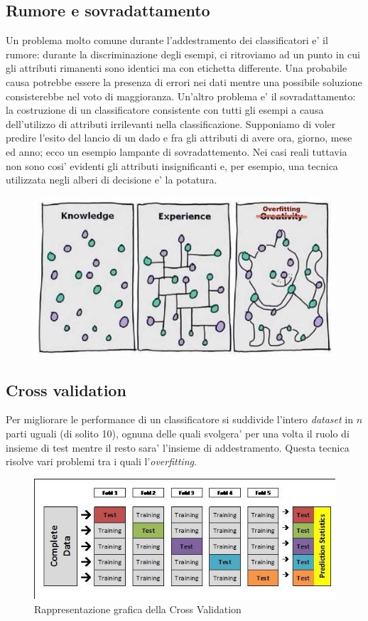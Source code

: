 \subsection{Rumore e sovradattamento}
Un problema molto comune durante l'addestramento dei classificatori e' il rumore: durante la discriminazione degli esempi, ci ritroviamo ad un punto in cui gli attributi rimanenti sono identici ma con etichetta differente. Una probabile causa potrebbe essere la presenza di errori nei dati mentre una possibile soluzione consisterebbe nel voto di maggioranza.
Un'altro problema e' il sovradattamento: la costruzione di un classificatore consistente con tutti gli esempi a causa dell'utilizzo di attributi irrilevanti nella classificazione. Supponiamo di voler predire l'esito del lancio di un dado e fra gli attributi di avere ora, giorno, mese ed anno; ecco un esempio lampante di sovradattemento. Nei casi reali tuttavia non sono cosi' evidenti gli attributi insignificanti e, per esempio, una tecnica utilizzata  negli alberi di decisione e' la potatura.

\begin{figure}[H]
	\centering
	\includegraphics[width=0.7\linewidth]{img/overfitting}
	\caption{}
	\label{fig:overfitting}
\end{figure}


\subsection{Cross validation}
Per migliorare le performance di un classificatore si suddivide l'intero \textit{dataset} in $n$ parti uguali (di solito 10), ognuna delle quali svolgera' per una volta il ruolo di insieme di test mentre il resto sara' l'insieme di addestramento. Questa tecnica risolve vari problemi tra i quali l'\textit{overfitting}.\\

\begin{figure}[H]
	\centering
	\includegraphics[width=0.7\linewidth]{img/crossvalidation}
	\caption{Rappresentazione grafica della Cross Validation}
	\label{fig:crossvalidation}
\end{figure}


